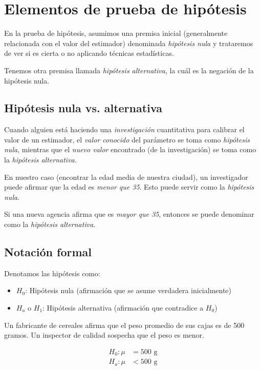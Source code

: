 \section{Elementos de prueba de hipótesis}

En la prueba de hipótesis, asumimos una premisa inicial (generalmente relacionada con el valor del estimador) denominada \emph{hipótesis nula} y trataremos de ver si es cierta o no aplicando técnicas estadísticas.

Tenemos otra premisa llamada \emph{hipótesis alternativa}, la cuál es la negación de la hipótesis nula.

\subsection{Hipótesis nula vs. alternativa}

Cuando alguien está haciendo una \emph{investigación} cuantitativa para calibrar el valor de un estimador, el \emph{valor conocido} del parámetro se toma como \emph{hipótesis nula}, mientras que el \emph{nuevo valor} encontrado (de la investigación) se toma como la \emph{hipótesis alternativa}.

En nuestro caso (encontrar la edad media de nuestra ciudad), un investigador puede afirmar que la edad es \emph{menor que 35}. Esto puede servir como la \emph{hipótesis nula}.

Si una nueva agencia afirma que es \emph{mayor que 35}, entonces se puede denominar como la \emph{hipótesis alternativa}.

\subsection{Notación formal}

Denotamos las hipótesis como:
\begin{itemize}
	\item $H_0$: Hipótesis nula (afirmación que se asume verdadera inicialmente)
	\item $H_a$ o $H_1$: Hipótesis alternativa (afirmación que contradice a $H_0$)
\end{itemize}

\begin{ejemplo}
	Un fabricante de cereales afirma que el peso promedio de sus cajas es de 500 gramos. Un inspector de calidad sospecha que el peso es menor.

	\begin{align}
		H_0: \mu &= 500 \text{ g} \\
		H_a: \mu &< 500 \text{ g}
	\end{align}
\end{ejemplo}

